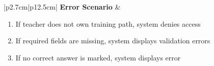 \begin{table}[H]
\begin{tabular}{|p{2.7cm}|p{12.5cm}|}
        \hline
        \textbf{Error Scenario} & \begin{minipage}[t]{\linewidth}
                                      \begin{enumerate}[topsep=0pt,itemsep=1pt,parsep=0pt,partopsep=0pt]
                                          \item If teacher does not own training path, system denies access
                                          \item If required fields are missing, system displays validation errors
                                          \item If no correct answer is marked, system displays error
                                      \end{enumerate}
                                  \end{minipage} \\
        \hline
    \end{tabular}
    \label{tab:teacher-add-questions}
\end{table}
